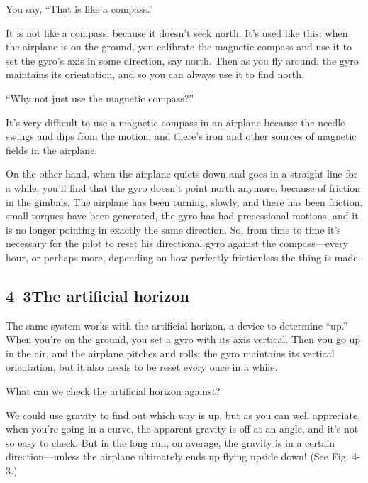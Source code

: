 \documentclass[11pt,oneside]{article}
\begin{document}
You say, ``That is like a compass.''\par

It is not like a compass, because it doesn't seek north. It's used like this: when the airplane is on the ground, you calibrate the magnetic compass and use it to set the gyro's axis in some direction, say north. Then as you fly around, the gyro maintains its orientation, and so you can always use it to find north.\par

``Why not just use the magnetic compass?''\par

It's very difficult to use a magnetic compass in an airplane because the needle swings and dips from the motion, and there's iron and other sources of magnetic fields in the airplane.\par

On the other hand, when the airplane quiets down and goes in a straight line for a while, you'll find that the gyro doesn't point north anymore, because of friction in the gimbals. The airplane has been turning, slowly, and there has been friction, small torques have been generated, the gyro has had precessional motions, and it is no longer pointing in exactly the same direction. So, from time to time it's necessary for the pilot to reset his directional gyro against the compass---every hour, or perhaps more, depending on how perfectly frictionless the thing is made.\par

\subsection*{4--3The artificial horizon}

The same system works with the artificial horizon, a device to determine ``up.'' When you're on the ground, you set a gyro with its axis vertical. Then you go up in the air, and the airplane pitches and rolls; the gyro maintains its vertical orientation, but it also needs to be reset every once in a while.\par

What can we check the artificial horizon against?\par

We could use gravity to find out which way is up, but as you can well appreciate, when you're going in a curve, the apparent gravity is off at an angle, and it's not so easy to check. But in the long run, on average, the gravity is in a certain direction---unless the airplane ultimately ends up flying upside down! (See Fig. 4-3.)\par
\end{document}
